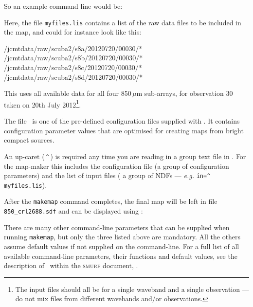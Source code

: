 So an example command line would be:

Here, the file \texttt{myfiles.lis} contains a list of the raw data
files to be included in the map, and could for instance look like this:

\begin{terminalv}
/jcmtdata/raw/scuba2/s8a/20120720/00030/*
/jcmtdata/raw/scuba2/s8b/20120720/00030/*
/jcmtdata/raw/scuba2/s8c/20120720/00030/*
/jcmtdata/raw/scuba2/s8d/20120720/00030/*
\end{terminalv}

This uses all available data for all four 850\,$\mu$m sub-arrays, for
observation 30 taken on 20th July 2012\footnote{The input files should all be
for a single waveband and a single observation --- do not mix files from
different wavebands and/or observations.}.

The file \brightcompact\ is one of the pre-defined configuration files
supplied with \smurf. It contains configuration parameter values that are
optimised for creating maps from bright compact sources.

\begin{tip}
  An up-caret (\,\texttt{\^{}}\,) is required any time you are reading
  in a group text file in \starlink. For the map-maker this includes
  the configuration file (a group of configuration parameters) and the
  list of input files ( a group of NDFs --- \emph{e.g.}  \texttt{in=\^{}\,myfiles.lis}).
\end{tip}

After the \texttt{makemap} command completes, the final map will be left in file
\texttt{850\_crl2688.sdf} and can be displayed using \gaia:

\begin{terminalv}
\end{terminalv}

There are many other command-line parameters that can be supplied when
running \texttt{makemap}, but only the three listed above are mandatory. All the
others assume default values if not supplied on the command-line. For a
full list of all available command-line parameters, their functions and
default values, see the description of \makemap\ within the \textsc{smurf}
document, .

